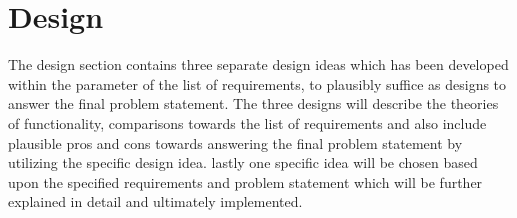 \section{Design}
The design section contains three separate design ideas which has been developed within the parameter of the list of requirements, to plausibly suffice as designs to answer the final problem statement. The three designs will describe the theories of functionality, comparisons towards the list of requirements and also include plausible pros and cons towards answering the final problem statement by utilizing the specific design idea.
lastly one specific idea will be chosen based upon the specified requirements and problem statement which will be further explained in detail and ultimately implemented. 








